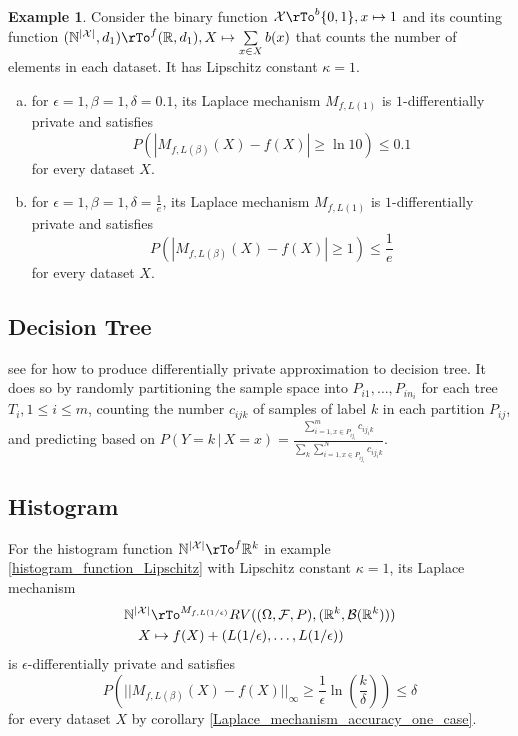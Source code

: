 \documentclass[12pt]{amsart}
\theoremstyle{definition}
\newtheorem{example}[theorem]{Example}
\begin{document}
\begin{example} \label{Laplace_mechanism_counting_function} Consider the binary function $\mathcal{X} \rTo^b \{0, 1\}, x \mapsto 1$ and its counting function $(\mathbb{N}^{|\mathcal{X}|}, d_1) \rTo^f (\mathbb{R}, d_1), X \mapsto \sum\limits_{x \in X} b(x)$ that counts the number of elements in each dataset. It has Lipschitz constant $\kappa = 1$.
\begin{enumerate}[a.]
\item for $\epsilon = 1, \beta = 1, \delta = 0.1$, its Laplace mechanism $M_{f, L(1)}$ is $1$-differentially private and satisfies 
$$P( |M_{f, L(\beta)}(X) - f(X)| \geq \ln 10) \leq 0.1$$
for every dataset $X$.
\item for $\epsilon = 1, \beta = 1, \delta = \frac{1}{e}$, its Laplace mechanism $M_{f, L(1)}$ is $1$-differentially private and satisfies 
$$P( |M_{f, L(\beta)}(X) - f(X)| \geq 1) \leq \frac{1}{e}$$
for every dataset $X$.
\end{enumerate} 
\end{example}

\subsection{Decision Tree} see \cite{decision_tree} for how to produce differentially private approximation to decision tree. It does so by randomly partitioning the sample space into $P_{i1}, \dots , P_{i n_i}$ for each tree $T_i, 1\leq i \leq m$, counting the number $c_{ijk}$ of samples of label $k$ in each partition $P_{ij}$, and predicting based on $P(Y = k \,|\, X = x) = \frac{\sum\limits_{i = 1, x \in P_{i j_i}}^m c_{ij_i k}}{\sum\limits_k \sum\limits_{i = 1, x \in P_{i j_i}}^N c_{ij_i k}}$.

\subsection{Histogram} For the histogram function $\mathbb{N}^{|\mathcal{X}|} \rTo^f \mathbb{R}^k$ in example \ref{histogram_function_Lipschitz} with Lipschitz constant $\kappa = 1$, its Laplace mechanism
\begin{align*}
\mathbb{N}^{|\mathcal{X}|} & \rTo^{M_{f, L(1 / \epsilon)}} RV((\Omega, \mathcal{F}, P), (\mathbb{R}^k, \mathcal{B}(\mathbb{R}^k))) \\
X & \mapsto f(X) + (L(1 / \epsilon), \dots , L(1 / \epsilon)) \\
\end{align*}
is $\epsilon$-differentially private and satisfies
$$P\left( ||M_{f, L(\beta)}(X) - f(X)||_{\infty} \geq \frac{1}{\epsilon} \ln \left( \frac{k}{\delta} \right) \right) \leq \delta$$
for every dataset $X$ by corollary \ref{Laplace_mechanism_accuracy_one_case}.
\end{document}
